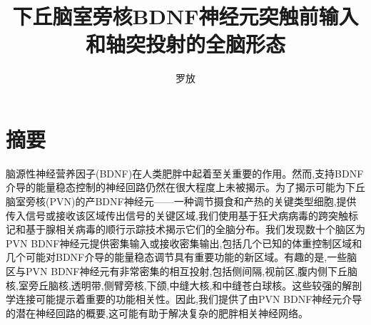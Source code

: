 \confidential{}%
\title{下丘脑室旁核BDNF神经元突触前输入和轴突投射的全脑形态}%
\author{罗\quad 放}%

\advisorsec{}%


\maketitle%
\makeenglishtitle%
\makedeclaration%
\chapter*{摘\quad 要}%
\setcounter{page}{1}%

脑源性神经营养因子(BDNF)在人类肥胖中起着至关重要的作用。然而,支持BDNF介导的能量稳态控制的神经回路仍然在很大程度上未被揭示。为了揭示可能为下丘脑室旁核(PVN)的产BDNF神经元------一种调节摄食和产热的关键类型细胞,提供传入信号或接收该区域传出信号的关键区域,我们使用基于狂犬病病毒的跨突触标记和基于腺相关病毒的顺行示踪技术揭示它们的全脑分布。我们发现数十个脑区为PVN BDNF神经元提供密集输入或接收密集输出,包括几个已知的体重控制区域和几个可能对BDNF介导的能量稳态调节具有重要功能的新区域。有趣的是,一些脑区与PVN BDNF神经元有非常密集的相互投射,包括侧间隔,视前区,腹内侧下丘脑核,室旁丘脑核,透明带,侧臂旁核,下颌,中缝大核,和中缝苍白球核。这些较强的解剖学连接可能提示着重要的功能相关性。因此,我们提供了由PVN BDNF神经元介导的潜在神经回路的概要,这可能有助于解决复杂的肥胖相关神经网络。


